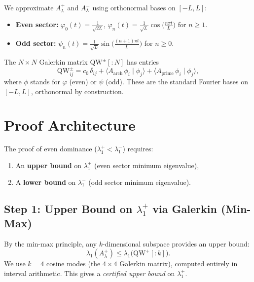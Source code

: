 \documentclass[12pt,a4paper]{article}
\theoremstyle{definition}
\theoremstyle{remark}
\begin{document}
We approximate $A_\lambda^+$ and $A_\lambda^-$ using orthonormal bases on $[-L,L]$:
\begin{itemize}
  \item \textbf{Even sector:} $\varphi_0(t) = \frac{1}{\sqrt{2L}}$, \quad $\varphi_n(t) = \frac{1}{\sqrt{L}}\cos\!\bigl(\frac{n\pi t}{L}\bigr)$ for $n \geq 1$.
  \item \textbf{Odd sector:} $\psi_n(t) = \frac{1}{\sqrt{L}}\sin\!\bigl(\frac{(n+1)\pi t}{L}\bigr)$ for $n \geq 0$.
\end{itemize}
The $N \times N$ Galerkin matrix $\mathrm{QW}^{\pm}[{:}N]$ has entries
\[
\mathrm{QW}^{\pm}_{ij} = c_0\,\delta_{ij} + \langle A_{\mathrm{arch}}\,\phi_i \mid \phi_j \rangle + \langle A_{\mathrm{prime}}\,\phi_i \mid \phi_j \rangle,
\]
where $\phi$ stands for $\varphi$ (even) or $\psi$ (odd). These are the standard Fourier bases on $[-L,L]$, orthonormal by construction.


\section{Proof Architecture}
\label{sec:architecture}

The proof of even dominance ($\lambda_1^+ < \lambda_1^-$) requires:
\begin{enumerate}
  \item An \textbf{upper bound} on $\lambda_1^+$ (even sector minimum eigenvalue),
  \item A \textbf{lower bound} on $\lambda_1^-$ (odd sector minimum eigenvalue).
\end{enumerate}

\subsection{Step 1: Upper Bound on $\lambda_1^+$ via Galerkin (Min-Max)}

By the min-max principle, any $k$-dimensional subspace provides an upper bound:
\begin{equation}
\label{eq:galerkin-upper}
\lambda_1(A_\lambda^+) \leq \lambda_1\bigl(\mathrm{QW}^+[{:}k]\bigr).
\end{equation}
We use $k = 4$ cosine modes (the $4 \times 4$ Galerkin matrix), computed entirely in interval arithmetic. This gives a \emph{certified upper bound} on $\lambda_1^+$.
\end{document}
